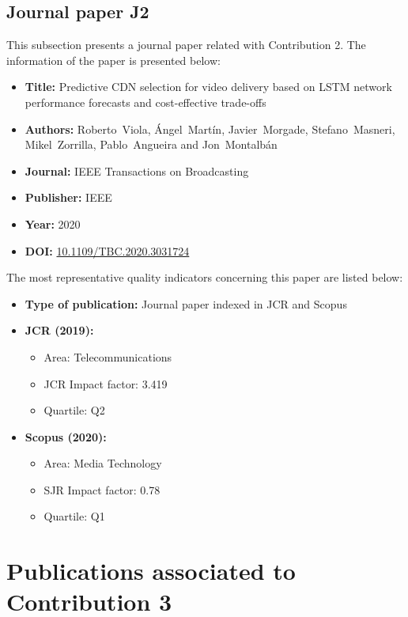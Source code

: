 \subsection{Journal paper J2}
\label{chap:IEEETBC2020}
This subsection presents a journal paper related with Contribution 2.
The information of the paper is presented below:
\begin{itemize} \itemsep1pt\parskip0pt
	\item \textbf{Title:} Predictive CDN selection for video delivery based on LSTM network performance forecasts and cost-effective trade-offs
	\item \textbf{Authors:} Roberto~Viola, \'Angel~Mart\'in, Javier~Morgade, Stefano~Masneri, Mikel~Zorrilla, Pablo~Angueira and Jon~Montalb\'an
	\item \textbf{Journal:} IEEE Transactions on Broadcasting
	\item \textbf{Publisher:} IEEE
	\item \textbf{Year:} 2020
	\item \textbf{DOI:} \url{10.1109/TBC.2020.3031724}
\end{itemize}
The most representative quality indicators concerning this paper are listed below:
\begin{itemize} \itemsep1pt\parskip0pt
	\item \textbf{Type of publication:} Journal paper indexed in JCR and Scopus
	\item \textbf{JCR (2019):}
	\begin{itemize}
		\item Area: Telecommunications
		\item JCR Impact factor: 3.419
		\item Quartile: Q2
	\end{itemize}
	\item \textbf{Scopus (2020):}
	\begin{itemize}
		\item Area: Media Technology
		\item SJR Impact factor: 0.78
		\item Quartile: Q1
	\end{itemize}
\end{itemize}


\section{Publications associated to Contribution 3}

